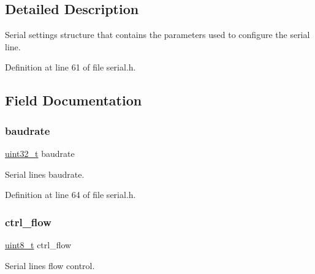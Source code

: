 \subsection{Detailed Description}
Serial settings structure that contains the parameters used to configure the serial line. 

Definition at line 61 of file serial.\+h.



\subsection{Field Documentation}
\mbox{\label{struct_s_e_r_i_a_l___s_e_t_t_i_n_g_s_ac4f06ea26ed6bd7ae83b92d64ac10b78}} 
\subsubsection{\texorpdfstring{baudrate}{baudrate}}
{\footnotesize\ttfamily \hyperlink{stdint_8h_a324c5d28c0d82f502a234ab99efac87a}{uint32\+\_\+t} baudrate}



Serial line\textquotesingle{}s baudrate. 



Definition at line 64 of file serial.\+h.

\mbox{\label{struct_s_e_r_i_a_l___s_e_t_t_i_n_g_s_a6f2a9d6a71d9ca705cf561f08e4e222c}} 
\subsubsection{\texorpdfstring{ctrl\+\_\+flow}{ctrl\_flow}}
{\footnotesize\ttfamily \hyperlink{stdint_8h_aba7bc1797add20fe3efdf37ced1182c5}{uint8\+\_\+t} ctrl\+\_\+flow}



Serial line\textquotesingle{}s flow control. 



